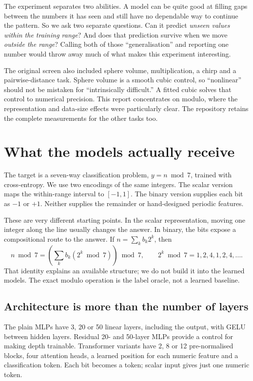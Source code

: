 \documentclass{article}
\begin{document}
The experiment separates two abilities. A model can be quite good at filling gaps between
the numbers it has seen and still have no dependable way to continue the pattern.
So we ask two separate questions. Can it predict \emph{unseen values within the
training range}? And does that prediction survive when we move \emph{outside the
range}? Calling both of those ``generalisation'' and reporting one number would
throw away much of what makes this experiment interesting.

The original screen also included sphere volume, multiplication, a chirp and a
pairwise-distance task. Sphere volume is a smooth cubic control, so ``nonlinear''
should not be mistaken for ``intrinsically difficult.'' A fitted cubic solves that
control to numerical precision. This report concentrates on modulo, where the
representation and data-size effects were particularly clear. The repository
retains the complete measurements for the other tasks too.

\newpage
\section{What the models actually receive}
The target is a seven-way classification problem, $y=n\bmod 7$, trained with
cross-entropy. We use two encodings of the same integers. The scalar version maps
the within-range interval to $[-1,1]$. The binary version supplies each bit as
$-1$ or $+1$. Neither supplies the remainder or hand-designed periodic features.

These are very different starting points. In the scalar representation, moving
one integer along the line usually changes the answer. In binary, the bits expose
a compositional route to the answer. If $n=\sum_k b_k2^k$, then
\[
 n\bmod 7=\left(\sum_k b_k(2^k\bmod 7)\right)\bmod 7,
 \qquad 2^k\bmod 7=1,2,4,1,2,4,\ldots.
\]
That identity explains an available structure; we do not build it into the learned
models. The exact modulo operation is the label oracle, not a learned baseline.

\subsection{Architecture is more than the number of layers}
The plain MLPs have 3, 20 or 50 linear layers, including the output, with GELU
between hidden layers. Residual 20- and 50-layer MLPs provide a control for making
depth trainable. Transformer variants have 2, 8 or 12 pre-normalised blocks, four
attention heads, a learned position for each numeric feature and a classification
token. Each bit becomes a token; scalar input gives just one numeric token.
\end{document}
